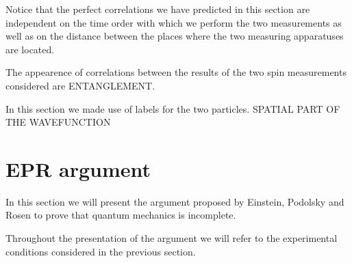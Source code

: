 \begin{observation}
  Notice that the perfect correlations we have predicted in this section are independent on the time order with which we perform the two measurements as well as on the distance between the places where the two measuring apparatuses are located.%
\end{observation}

\begin{observation}
  The appearence of correlations between the results of the two spin measurements considered are ENTANGLEMENT.
\end{observation}

\begin{observation}
  In this section we made use of labels for the two particles.
SPATIAL PART OF THE WAVEFUNCTION
\end{observation}


\section{EPR argument}
In this section we will present the argument proposed by Einstein, Podolsky and Rosen \cite{PhysRev.47.777} to prove that quantum mechanics is incomplete.

\begin{note}
Throughout the presentation of the argument we will refer to the experimental conditions considered in the previous section.
\end{note}

